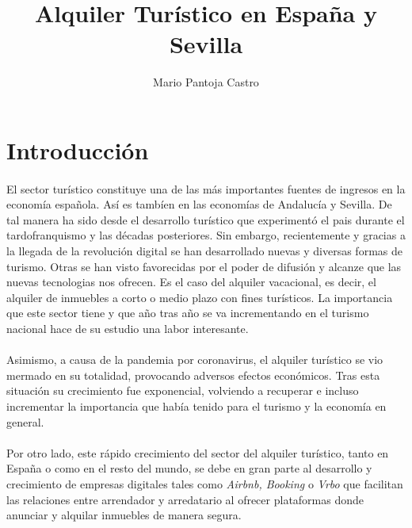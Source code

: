 \documentclass[a4paper]{article}
\title{Alquiler Turístico en España y Sevilla}
\author{Mario Pantoja Castro}
\begin{document}
    \begin{titlepage}

        \maketitle
        
    \end{titlepage}

    \tableofcontents

    \newpage

    \section{Introducción}

        \paragraph*{}
        El sector turístico constituye una de las más importantes fuentes de ingresos en la economía española. Así es tambíen en las economías de Andalucía y
        Sevilla. De tal manera ha sido desde el desarrollo turístico que experimentó el pais durante el tardofranquismo y las décadas posteriores. Sin embargo, 
        recientemente y gracias a la llegada de la revolución digital se han desarrollado nuevas y diversas formas de turismo. Otras se han visto favorecidas
        por el poder de difusión y alcanze que las nuevas tecnologias nos ofrecen. Es el caso del alquiler vacacional, es decir, el alquiler de inmuebles a
        corto o medio plazo con fines turísticos. La importancia que este sector tiene y que año tras año se va incrementando en el turismo nacional hace de 
        su estudio una labor interesante. 
        
        \paragraph*{}
        Asimismo, a causa de la pandemia por coronavirus, el alquiler turístico se vio mermado en su totalidad, 
        provocando adversos efectos económicos. Tras esta situación su crecimiento fue exponencial, volviendo a recuperar e incluso incrementar la importancia
        que había tenido para el turismo y la economía en general.

        \paragraph*{}
        Por otro lado, este rápido crecimiento del sector del alquiler turístico, tanto en España o como en el resto del mundo, se debe en gran parte al 
        desarrollo y crecimiento de empresas digitales tales como \textit{Airbnb, Booking} o \textit{Vrbo} que facilitan las relaciones entre
        arrendador y arredatario al ofrecer plataformas donde anunciar y alquilar inmuebles de manera segura.
\end{document}
